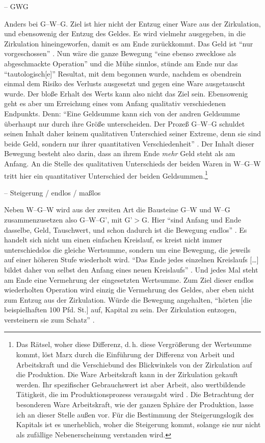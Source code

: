 \documentclass[12pt,
               DIV13,
               paper=a4,
               twoside=false,
               onehalfspacing,
               bibliography=totoc,
               toc=graduated,
               draft,
               ]{scrartcl}
\newcommand{\lips}{\dots\unkern}
\newcommand{\pc}[2]{\parencite[#1]{#2}}
\newcommand{\vgl}[2]{\parencite[vgl.][#1]{#2}}
\newcommand{\gwg}{G--W--G'\xspace}
\newcommand{\wgw}{W--G--W\xspace}
\begin{document}
-- GWG

Anders bei G--W--G. Ziel ist hier nicht der Entzug einer Ware aus der
Zirkulation, und ebensowenig der Entzug des Geldes. Es wird vielmehr
ausgegeben, in die Zirkulation hineingeworfen, damit es am Ende
zurückkommt. Das Geld ist "`nur vorgeschossen"' \pc{163}{kap}. Nun
wäre die ganze Bewegung "`eine ebenso zwecklose als abgeschmackte
Operation"' \pc{165}{kap} und die Mühe sinnlos, stünde am Ende nur das
"`tautologisch[e]"' \pc{164}{kap} Resultat, mit dem begonnen wurde,
nachdem es obendrein einmal dem Risiko des Verlusts ausgesetzt und
gegen eine Ware ausgetauscht wurde. Der bloße Erhalt des Werts kann
also nicht das Ziel sein. Ebensowenig geht es aber um Erreichung eines
vom Anfang qualitativ verschiedenen Endpunkts. Denn: "`Eine Geldsumme
kann sich von der andren Geldsumme überhaupt nur durch ihre Größe
unterscheiden. Der Prozeß G--W--G schuldet seinen Inhalt daher keinem
qualitativen Unterschied seiner Extreme, denn sie sind beide Geld,
sondern nur ihrer quantitativen Verschiedenheit"' \pc{165}{kap}. Der
Inhalt dieser Bewegung besteht also darin, dass an ihrem Ende
\emph{mehr} Geld steht als am Anfang. An die Stelle des qualitativen
Unterschieds der beiden Waren in \wgw tritt hier ein quantitativer
Unterschied der beiden Geldsummen.\footnote{Das Rätsel, woher diese
Differenz, d.\,h. diese Vergrößerung der Wertsumme kommt, löst Marx
durch die Einführung der Differenz von Arbeit und Arbeitskraft und die
Verschiebund des Blickwinkels von der Zirkulation auf die Produktion.
Die Ware Arbeitskraft kann in der Zirkulation gekauft werden. Ihr
spezifischer Gebrauchswert ist aber Arbeit, also wertbildende
Tätigkeit, die im Produktionsprozess verausgabt wird \vgl{xx}{kap}.
Die Betrachtung der besonderen Ware Arbeitskraft, wie der ganzen
Sphäre der Produktion, lasse ich an dieser Stelle außen vor. Für die
Bestimmung der Steigerungslogik des Kapitals ist es unerheblich, woher
die Steigerung kommt, solange sie nur nicht als zufällige
Nebenerscheinung verstanden wird.}

-- Steigerung / endlos / maßlos

Neben \wgw wird aus der zweiten Art die Bausteine G--W und W--G
zusammenzusetzen also \gwg, mit G'$>$G. Hier "`sind Anfang und Ende
dasselbe, Geld, Tauschwert, und schon dadurch ist die Bewegung
endlos"' \pc{166}{kap}. Es handelt sich nicht um
einen einfachen Kreislauf, es kreist nicht immer unterschiedslos die
gleiche Wertsumme, sondern um eine Bewegung, die jeweils auf
einer höheren Stufe wiederholt wird. "`Das Ende jedes einzelnen Kreislaufs [\lips]
bildet daher von selbst den Anfang eines neuen Kreislaufs"' \pc{S. 166
f.}{kap}. Und jedes Mal steht am Ende eine Vermehrung der
eingesetzten Wertsumme. Zum Ziel dieser endlos wiederholten Operation
wird einzig die Vermehrung des Geldes, aber eben nicht zum Entzug aus
der Zirkulation. Würde die Bewegung angehalten, "`hörten [die
beispielhaften 100 Pfd. St.] auf, Kapital zu sein. Der Zirkulation
entzogen, versteinern sie zum Schatz"' \pc{166}{kap}.
\end{document}
